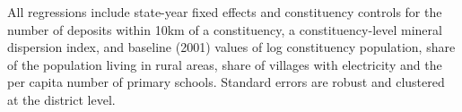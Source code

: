 All regressions include state-year fixed effects and constituency
controls for the number of deposits within 10km of a constituency, a
constituency-level mineral dispersion index, and baseline (2001)
values of log constituency population, share of the population living
in rural areas, share of villages with electricity and the per
capita number of primary schools.  Standard errors are robust and
clustered at the district level.%

